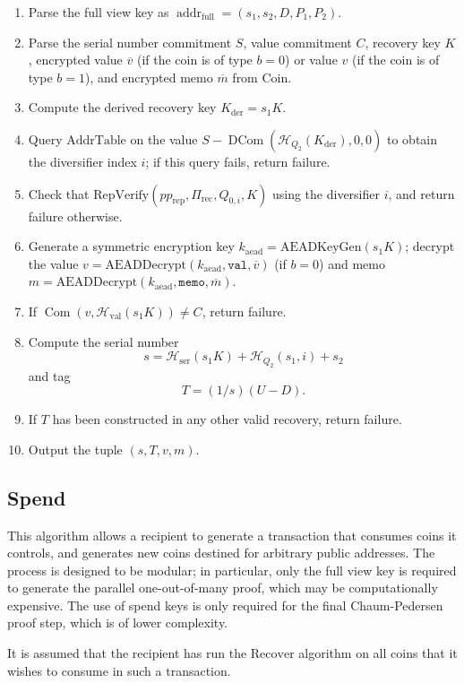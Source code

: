 \documentclass{llncs}
\newcommand{\hash}{\mathcal{H}}
\newcommand{\addr}{\operatorname{addr}}
\newcommand{\com}{\operatorname{Com}}
\newcommand{\dcom}{\operatorname{DCom}}
\begin{document}
\begin{enumerate}
\item Parse the full view key as $\addr_{\text{full}} = (s_1, s_2, D, P_1, P_2)$.
\item Parse the serial number commitment $S$, value commitment $C$, recovery key $K$, encrypted value $\overline{v}$ (if the coin is of type $b=0$) or value $v$ (if the coin is of type $b=1$), and encrypted memo $\overline{m}$ from $\text{Coin}$.
\item Compute the derived recovery key $K_{\text{der}} = s_1 K$.
\item Query $\text{AddrTable}$ on the value $S - \dcom(\hash_{Q_2}(K_{\text{der}}),0,0)$ to obtain the diversifier index $i$; if this query fails, return failure.
\item Check that $\text{RepVerify}(pp_{\text{rep}},\Pi_{\text{rec}},Q_{0,i},K)$ using the diversifier $i$, and return failure otherwise.
\item Generate a symmetric encryption key $k_{\text{aead}} = \text{AEADKeyGen}(s_1 K)$; decrypt the value $v = \text{AEADDecrypt}(k_{\text{aead}},\texttt{val},\overline{v})$ (if $b=0$) and memo $m = \text{AEADDecrypt}(k_{\text{aead}},\texttt{memo},\overline{m})$.
\item If $\com(v,\hash_{\text{val}}(s_1 K)) \neq C$, return failure.
\item Compute the serial number $$s = \hash_{\text{ser}}(s_1 K) + \hash_{Q_2}(s_1,i) + s_2$$ and tag $$T = (1/s)(U - D).$$
\item If $T$ has been constructed in any other valid recovery, return failure.
\item Output the tuple $(s, T, v, m)$.
\end{enumerate}


\subsection{Spend}

This algorithm allows a recipient to generate a transaction that consumes coins it controls, and generates new coins destined for arbitrary public addresses.
The process is designed to be modular; in particular, only the full view key is required to generate the parallel one-out-of-many proof, which may be computationally expensive.
The use of spend keys is only required for the final Chaum-Pedersen proof step, which is of lower complexity.

It is assumed that the recipient has run the $\text{Recover}$ algorithm on all coins that it wishes to consume in such a transaction.
\end{document}
